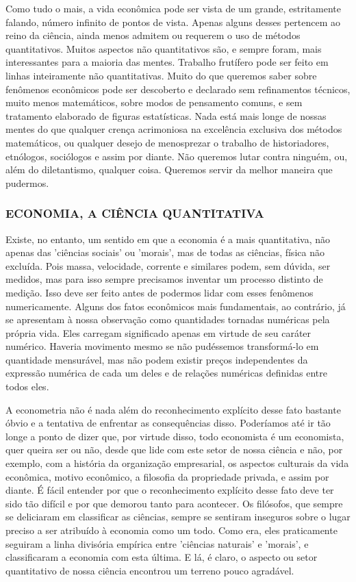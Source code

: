 \documentclass[12pt]{article}
\begin{document}
Como tudo o mais, a vida econômica pode ser vista de um grande, estritamente falando, número infinito de pontos de vista. Apenas alguns desses pertencem ao reino da ciência, ainda menos admitem ou requerem o uso de métodos quantitativos. Muitos aspectos não quantitativos são, e sempre foram, mais interessantes para a maioria das mentes. Trabalho frutífero pode ser feito em linhas inteiramente não quantitativas. Muito do que queremos saber sobre fenômenos econômicos pode ser descoberto e declarado sem refinamentos técnicos, muito menos matemáticos, sobre modos de pensamento comuns, e sem tratamento elaborado de figuras estatísticas. Nada está mais longe de nossas mentes do que qualquer crença acrimoniosa na excelência exclusiva dos métodos matemáticos, ou qualquer desejo de menosprezar o trabalho de historiadores, etnólogos, sociólogos e assim por diante. Não queremos lutar contra ninguém, ou, além do diletantismo, qualquer coisa. Queremos servir da melhor maneira que pudermos.

\subsubsection{\textbf{ECONOMIA, A CIÊNCIA QUANTITATIVA}}
Existe, no entanto, um sentido em que a economia é a mais quantitativa, não apenas das 'ciências sociais' ou 'morais', mas de todas as ciências, física não excluída. Pois massa, velocidade, corrente e similares podem, sem dúvida, ser medidos, mas para isso sempre precisamos inventar um processo distinto de medição. Isso deve ser feito antes de podermos lidar com esses fenômenos numericamente. Alguns dos fatos econômicos mais fundamentais, ao contrário, já se apresentam à nossa observação como quantidades tornadas numéricas pela própria vida. Eles carregam significado apenas em virtude de seu caráter numérico. Haveria movimento mesmo se não pudéssemos transformá-lo em quantidade mensurável, mas não podem existir preços independentes da expressão numérica de cada um deles e de relações numéricas definidas entre todos eles.

A econometria não é nada além do reconhecimento explícito desse fato bastante óbvio e a tentativa de enfrentar as consequências disso. Poderíamos até ir tão longe a ponto de dizer que, por virtude disso, todo economista é um economista, quer queira ser ou não, desde que lide com este setor de nossa ciência e não, por exemplo, com a história da organização empresarial, os aspectos culturais da vida econômica, motivo econômico, a filosofia da propriedade privada, e assim por diante. É fácil entender por que o reconhecimento explícito desse fato deve ter sido tão difícil e por que demorou tanto para acontecer. Os filósofos, que sempre se deliciaram em classificar as ciências, sempre se sentiram inseguros sobre o lugar preciso a ser atribuído à economia como um todo. Como era, eles praticamente seguiram a linha divisória empírica entre 'ciências naturais' e 'morais', e classificaram a economia com esta última. E lá, é claro, o aspecto ou setor quantitativo de nossa ciência encontrou um terreno pouco agradável.
\end{document}
